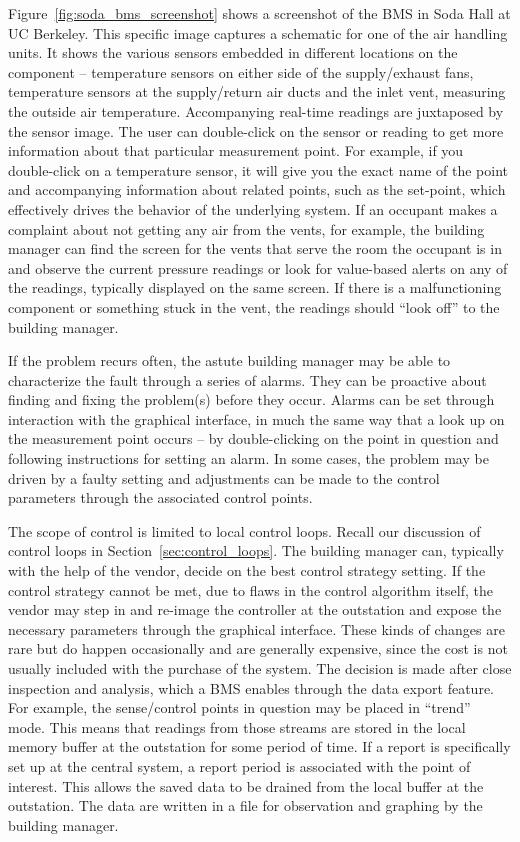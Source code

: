 Figure~\ref{fig:soda_bms_screenshot} shows a screenshot of the BMS in Soda Hall at UC Berkeley.  This specific image
captures a schematic for one of the air handling units.  It shows the various sensors embedded in different locations
on the component -- temperature sensors on either side of the supply/exhaust fans, temperature sensors at the supply/return 
air ducts and the inlet vent, measuring the outside air temperature.  Accompanying real-time readings are juxtaposed
by the sensor image.  The user can double-click on the sensor or reading to get more information about that particular 
measurement point.  For example, if you double-click on a temperature sensor, it will give you the exact name of the 
point and accompanying information about related points, such as the set-point, which effectively drives the behavior of 
the underlying system.  If an occupant makes a complaint about not getting any air from the vents, for example, the 
building manager can find the screen for the vents that serve the room the occupant is in and observe the current
pressure readings or look for value-based alerts on any of the readings, typically displayed on the same screen.
If there is a malfunctioning component or something stuck in the vent, the readings should ``look off'' to the building 
manager.

If the problem recurs often, the astute building manager may be able to characterize the fault through a series of alarms.
They can be proactive about finding and fixing the problem(s) before they occur.  Alarms can be set through interaction
with the graphical interface, in much the same way that a look up on the measurement point occurs -- by double-clicking on 
the point in question and following instructions for setting an alarm.  In some cases, the problem may be driven 
by a faulty setting and adjustments can be made to the control parameters through the associated control points.

The scope of control is limited to local control loops.  Recall our discussion of control loops in Section~\ref{sec:control_loops}.
The building manager can, typically with the help of the vendor, decide on the best control strategy setting.  If the control
strategy cannot be met, due to flaws in the control algorithm itself, the vendor may step in and re-image the controller
at the outstation and expose the necessary parameters through the graphical interface.  These kinds of changes are rare
but do happen occasionally and are generally expensive, since the cost is not usually included with the purchase
of the system.  The decision is made after close inspection and analysis, which a BMS enables through the data export feature.  
For example, the sense/control points in question may be placed in ``trend'' mode.  This means that readings
from those streams are stored in the local memory buffer at the outstation for some period of time.  If a report is specifically
set up at the central system, a report period is associated with the point of interest. This allows the saved data to be drained
from the local buffer at the outstation.  The data are written in a file for observation and graphing by the 
building manager.  %

